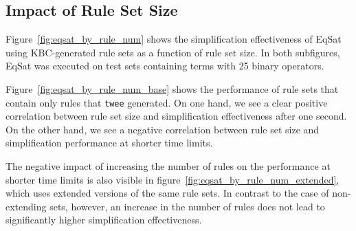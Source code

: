 \FloatBarrier
\subsection{Impact of Rule Set Size}
\label{sec:impact_set_size}
Figure~\ref{fig:eqsat_by_rule_num} shows the simplification effectiveness of EqSat using KBC-generated rule sets as a function of rule set size. In both subfigures, EqSat was executed on test sets containing terms with 25 binary operators.

Figure~\ref{fig:eqsat_by_rule_num_base} shows the performance of rule sets that contain only rules that \texttt{twee} generated. On one hand, we see a clear positive correlation between rule set size and simplification effectiveness after one second. On the other hand, we see a negative correlation between rule set size and simplification performance at shorter time limits. 

The negative impact of increasing the number of rules on the performance at shorter time limits is also visible in figure~\ref{fig:eqsat_by_rule_num_extended}, which uses extended versions of the same rule sets. In contrast to the case of non-extending sets, however, an increase in the number of rules does not lead to significantly higher simplification effectiveness.

